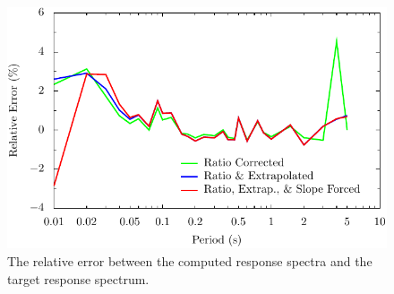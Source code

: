 \documentclass[12pt,oneside]{book}
\begin{document}
\begin{figure}[tb]
    \begin{center}
        \includegraphics[width=\linewidth]{figures/siteResponse/irvt-error.pdf}
    \end{center}
    \caption{The relative error between the computed response spectra and the target response spectrum.}
    \label{fig:irvt:error}
\end{figure}

\clearpage
\end{document}
